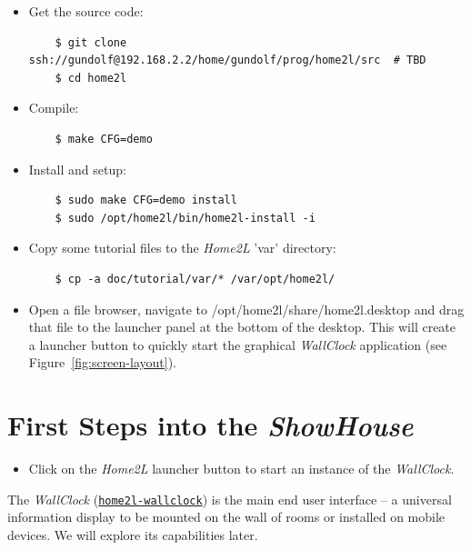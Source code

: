 \documentclass[12pt,english,parskip=half]{scrreprt}
\newcommand{\lst}[1]{\colorbox{lstbackground}{\ttfamily\footnotesize#1}}
\newcommand{\idx}[1]{#1\index{#1}}
\newcommand{\toolref}[1]{\hyperref[tool:#1]{\texttt{\idx{#1}}}}
\begin{document}
\begin{itemize}[$\blacktriangleright$]
\item
  Get the source code:
  \begin{lstlisting}
    $ git clone ssh://gundolf@192.168.2.2/home/gundolf/prog/home2l/src  # TBD
    $ cd home2l
  \end{lstlisting}
\item
  Compile:
  \begin{lstlisting}
    $ make CFG=demo
  \end{lstlisting}
\item
  Install and setup:
  \begin{lstlisting}
    $ sudo make CFG=demo install
    $ sudo /opt/home2l/bin/home2l-install -i
  \end{lstlisting}
\item
  Copy some tutorial files to the \emph{Home2L} 'var' directory:
  \begin{lstlisting}
    $ cp -a doc/tutorial/var/* /var/opt/home2l/
  \end{lstlisting}
\item
  Open a file browser, navigate to \lst{/opt/home2l/share/home2l.desktop}
  and drag that file to the launcher panel at the bottom of the desktop.
  This will create a launcher button to quickly start the graphical
  \emph{WallClock} application (see Figure~\ref{fig:screen-layout}).
\end{itemize}





\section{First Steps into the \emph{ShowHouse}}
\label{sec:tutorial-firststeps}


\begin{itemize}[$\blacktriangleright$]

\item
  Click on the \emph{Home2L} launcher button to start an instance of the
  \emph{WallClock}.

\end{itemize}

The \emph{WallClock} (\toolref{home2l-wallclock}) is the main end user interface -- a universal information display to be mounted on the wall of rooms or installed on mobile devices.
We will explore its capabilities later.
\end{document}
